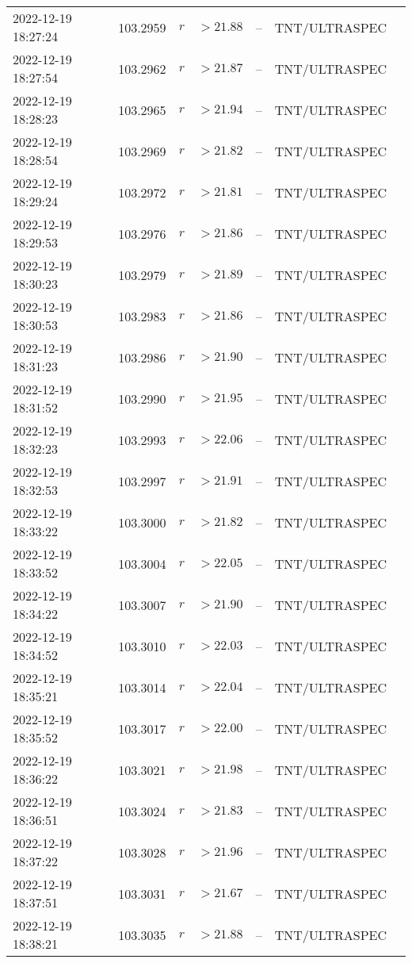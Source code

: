 \documentclass{nature_plusfigure}
\begin{document}
\begin{supplement}
\begin{center}
\begin{longtable}{lllllll}
2022-12-19 18:27:24 & 103.2959 & $r$ & $>21.88$ & -- & TNT/ULTRASPEC &  \\ 
2022-12-19 18:27:54 & 103.2962 & $r$ & $>21.87$ & -- & TNT/ULTRASPEC &  \\ 
2022-12-19 18:28:23 & 103.2965 & $r$ & $>21.94$ & -- & TNT/ULTRASPEC &  \\ 
2022-12-19 18:28:54 & 103.2969 & $r$ & $>21.82$ & -- & TNT/ULTRASPEC &  \\ 
2022-12-19 18:29:24 & 103.2972 & $r$ & $>21.81$ & -- & TNT/ULTRASPEC &  \\ 
2022-12-19 18:29:53 & 103.2976 & $r$ & $>21.86$ & -- & TNT/ULTRASPEC &  \\ 
2022-12-19 18:30:23 & 103.2979 & $r$ & $>21.89$ & -- & TNT/ULTRASPEC &  \\ 
2022-12-19 18:30:53 & 103.2983 & $r$ & $>21.86$ & -- & TNT/ULTRASPEC &  \\ 
2022-12-19 18:31:23 & 103.2986 & $r$ & $>21.90$ & -- & TNT/ULTRASPEC &  \\ 
2022-12-19 18:31:52 & 103.2990 & $r$ & $>21.95$ & -- & TNT/ULTRASPEC &  \\ 
2022-12-19 18:32:23 & 103.2993 & $r$ & $>22.06$ & -- & TNT/ULTRASPEC &  \\ 
2022-12-19 18:32:53 & 103.2997 & $r$ & $>21.91$ & -- & TNT/ULTRASPEC &  \\ 
2022-12-19 18:33:22 & 103.3000 & $r$ & $>21.82$ & -- & TNT/ULTRASPEC &  \\ 
2022-12-19 18:33:52 & 103.3004 & $r$ & $>22.05$ & -- & TNT/ULTRASPEC &  \\ 
2022-12-19 18:34:22 & 103.3007 & $r$ & $>21.90$ & -- & TNT/ULTRASPEC &  \\ 
2022-12-19 18:34:52 & 103.3010 & $r$ & $>22.03$ & -- & TNT/ULTRASPEC &  \\ 
2022-12-19 18:35:21 & 103.3014 & $r$ & $>22.04$ & -- & TNT/ULTRASPEC &  \\ 
2022-12-19 18:35:52 & 103.3017 & $r$ & $>22.00$ & -- & TNT/ULTRASPEC &  \\ 
2022-12-19 18:36:22 & 103.3021 & $r$ & $>21.98$ & -- & TNT/ULTRASPEC &  \\ 
2022-12-19 18:36:51 & 103.3024 & $r$ & $>21.83$ & -- & TNT/ULTRASPEC &  \\ 
2022-12-19 18:37:22 & 103.3028 & $r$ & $>21.96$ & -- & TNT/ULTRASPEC &  \\ 
2022-12-19 18:37:51 & 103.3031 & $r$ & $>21.67$ & -- & TNT/ULTRASPEC &  \\ 
2022-12-19 18:38:21 & 103.3035 & $r$ & $>21.88$ & -- & TNT/ULTRASPEC &  \\ 

\end{longtable}
\end{center}
\end{supplement}
\end{document}
